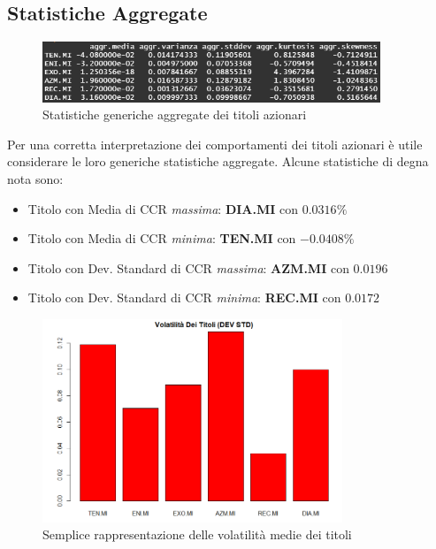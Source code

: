 \documentclass[12pt]{article}
\begin{document}
\subsection{Statistiche Aggregate}
\begin{figure}[!htb]
    \centering
    \includegraphics[width=0.9\textwidth]{immagini/stats.png}
    \caption{Statistiche generiche aggregate dei titoli azionari}
\end{figure}
\FloatBarrier
Per una corretta interpretazione dei comportamenti dei titoli azionari è utile considerare le loro generiche statistiche aggregate. Alcune statistiche di degna nota sono:
\begin{itemize}
    \item Titolo con Media di CCR \textit{massima}: \textbf{DIA.MI} con $0.0316\%$
    \item Titolo con Media di CCR \textit{minima}: \textbf{TEN.MI} con $-0.0408\%$
    \item Titolo con Dev. Standard di CCR \textit{massima}: \textbf{AZM.MI} con $0.0196$
    \item Titolo con Dev. Standard di CCR \textit{minima}: \textbf{REC.MI} con $0.0172$
\end{itemize}
\begin{figure}[!htb]
    \centering
    \includegraphics[width=0.8\textwidth]{immagini/volMedia.png}
    \caption{Semplice rappresentazione delle volatilità medie dei titoli}
\end{figure}
\FloatBarrier
\newpage
\end{document}
